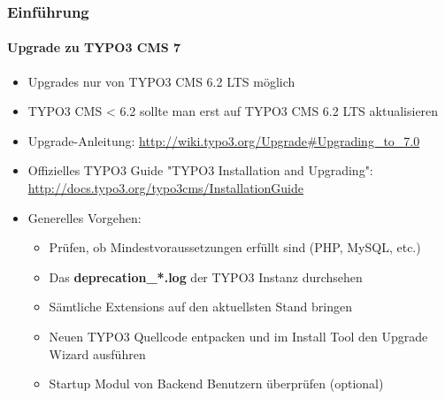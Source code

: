 \begin{frame}[fragile]
	\frametitle{Einführung}
	\framesubtitle{Upgrade zu TYPO3 CMS 7}

	\begin{itemize}
		\item Upgrades nur von TYPO3 CMS 6.2 LTS möglich
		\item TYPO3 CMS < 6.2 sollte man erst auf TYPO3 CMS 6.2 LTS aktualisieren
	\end{itemize}

	\begin{itemize}

		\item Upgrade-Anleitung:\newline
			\smaller\url{http://wiki.typo3.org/Upgrade#Upgrading_to_7.0}\normalsize
		\item Offizielles TYPO3 Guide "TYPO3 Installation and Upgrading":
			\smaller\url{http://docs.typo3.org/typo3cms/InstallationGuide}\normalsize
		\item Generelles Vorgehen:
			\begin{itemize}
				\item Prüfen, ob Mindestvoraussetzungen erfüllt sind \small(PHP, MySQL, etc.)
				\item Das \textbf{deprecation\_*.log} der TYPO3 Instanz durchsehen
				\item Sämtliche Extensions auf den aktuellsten Stand bringen
				\item Neuen TYPO3 Quellcode entpacken und im Install Tool den Upgrade Wizard ausführen
				\item Startup Modul von Backend Benutzern überprüfen (optional)
			\end{itemize}
	\end{itemize}

\end{frame}

